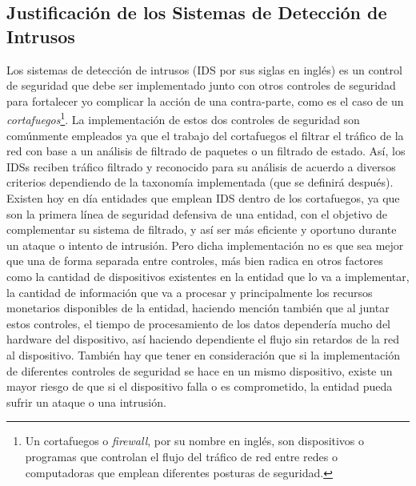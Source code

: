 \subsection{Justificación de los Sistemas de Detección de Intrusos}

Los sistemas de detección de intrusos (IDS por sus siglas en inglés) es un control de seguridad que debe ser implementado junto con otros controles de seguridad para fortalecer y\/o complicar la acción de una contra-parte, como es el caso de un \textit{cortafuegos}\footnote{Un cortafuegos o \textit{firewall}, por su nombre en inglés, son dispositivos o programas que controlan el flujo del tráfico de red entre redes o computadoras que emplean diferentes posturas de seguridad\cite{nist41}.}. La implementación de estos dos controles de seguridad son comúnmente empleados ya que el trabajo del cortafuegos el filtrar el tráfico de la red con base a un análisis de filtrado de paquetes o un filtrado de estado. Así, los IDSs reciben tráfico filtrado y reconocido para su análisis de acuerdo a diversos criterios dependiendo de la taxonomía implementada (que se definirá después). 
\\

Existen hoy en día entidades que emplean IDS dentro de los cortafuegos, ya que son la primera línea de seguridad defensiva de una entidad, con el objetivo de complementar su sistema de filtrado, y así ser más eficiente y oportuno durante un ataque o intento de intrusión. Pero dicha implementación no es que sea mejor que una de forma separada entre controles, más bien radica en otros factores como la cantidad de dispositivos existentes en la entidad que lo va a implementar, la cantidad de información que va a procesar y principalmente los recursos monetarios disponibles de la entidad, haciendo mención también que al juntar estos controles, el tiempo de procesamiento de los datos dependería mucho del hardware del dispositivo, así haciendo dependiente el flujo sin retardos de la red al dispositivo. También hay que tener en consideración que si la implementación de diferentes controles de seguridad se hace en un mismo dispositivo, existe un mayor riesgo de que si el dispositivo falla o es comprometido, la entidad pueda sufrir un ataque o una intrusión. 
\\